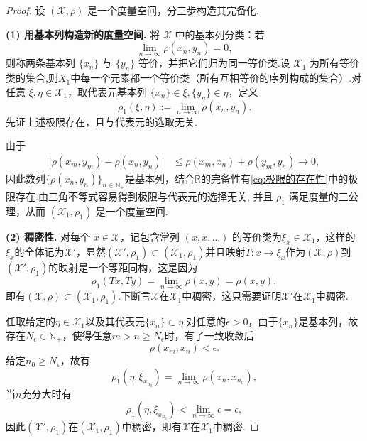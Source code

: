 \documentclass[../master.tex]{subfiles}
\begin{document}
\begin{proof}
设 $(\mathcal X,\rho)$ 是一个度量空间，分三步构造其完备化.

\textbf{(1) 用基本列构造新的度量空间.}
将 $\mathcal X$ 中的基本列分类：若
\[
\lim_{n\to\infty}\rho(x_n,y_n)=0,
\]
则称两条基本列 $\{x_n\}$ 与 $\{y_n\}$ 等价，并把它们归为同一等价类.设 $\mathcal X_1$ 为所有等价类的集合,则$X_1$中每一个元素都一个等价类（所有互相等价的序列构成的集合）.对任意
$\xi,\eta\in\mathcal X_1$，取代表元基本列 $\{x_n\}\in\xi,\{y_n\}\in\eta$，定义
\begin{equation}\label{eq:极限的存在性}
    \rho_1(\xi,\eta):=\lim_{n\to\infty}\rho(x_n,y_n).
\end{equation}
先证上述极限存在，且与代表元的选取无关.

由于
\begin{align*}
    |\rho(x_m,y_m)-\rho(x_n,y_n)|&\leq \rho(x_m,x_n)+\rho(y_m,y_n)\to 0,
\end{align*}
因此数列$\{\rho(x_n,y_n)\}_{n\in\mathbb{N}_+}$是基本列，结合$\mathbb{R}$的完备性有\eqref{eq:极限的存在性}中的极限存在.由三角不等式容易得到极限与代表元的选择无关, 并且 $\rho_1$ 满足度量的三公理，从而 $(\mathcal X_1,\rho_1)$ 是一个度量空间.

\textbf{(2) 稠密性.}
对每个 $x\in\mathcal X$，记包含常列 $(x,x,\ldots)$ 的等价类为$\xi_x\in\mathcal{X}_1$，这样的$\xi_x$的全体记为$\mathcal{X}'$，显然$(\mathcal{X'},\rho_1)\subset (\mathcal{X}_1,\rho_1)$并且映射$T:x\to\xi_x$作为$(\mathcal{X},\rho)$到$(\mathcal{X}',\rho_1)$的映射是一个等距同构，这是因为
\[
\rho_1(Tx,Ty)=\lim_{n\to\infty}\rho(x,y)=\rho(x,y),
\]
即有$(\mathcal{X},\rho)\subset(\mathcal{X}_1,\rho_1)$.下断言$\mathcal{X}$在$\mathcal{X}_1$中稠密，这只需要证明$\mathcal{X}'$在$\mathcal{X}_1$中稠密.

任取给定的$\eta\in\mathcal{X}_1$以及其代表元$\{x_n\}\subset\eta$.对任意的$\epsilon>0$，由于$\{x_n\}$是基本列，故存在$N_\epsilon\in\mathbb{N}_+$，使得任意$m>n\geq N_\epsilon$时，有了一致收敛后\begin{equation*}
    \rho(x_m,x_n)<\epsilon.
\end{equation*}
给定$n_0\geq N_\epsilon$，故有
\begin{equation*}
    \rho_1(\eta,\xi_{x_{n_0}}) = \lim_{n\to\infty}\rho(x_n,x_{n_0}),
\end{equation*}
当$n$充分大时有
\begin{equation*}
    \rho_1(\eta,\xi_{x_{n_0}}) < \lim_{n\to\infty}\epsilon = \epsilon,
\end{equation*}
因此$(\mathcal{X}',\rho_1)$在$(\mathcal{X}_1,\rho_1)$中稠密，即有$\mathcal{X}$在$\mathcal{X}_1$中稠密.




\end{proof}
\end{document}
